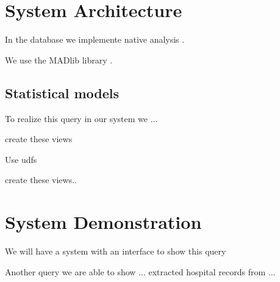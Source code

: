 
\section{System Architecture}

In the database we implemente native analysis .

We use the MADlib library \cite{Cohen:2009:MSN:1687553.1687576}.

\subsection{Statistical models}

To realize this query in our system we ...

create these views

Use udfs

create these views..


\section{System Demonstration}

We will have a system with an interface to show this query

Another query we are able to show ... extracted hospital records from ...
